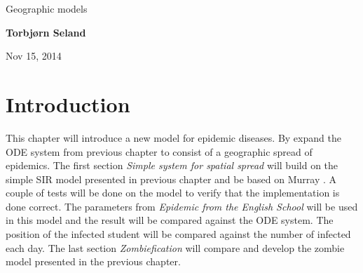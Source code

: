 \documentclass[%
twoside,                 %
final,                   %
10pt]{article}
\begin{document}




\thispagestyle{empty}

\begin{center}
{\LARGE\bf
\begin{spacing}{1.25}
Geographic models 
\end{spacing}
}
\end{center}


\begin{center}
{\bf Torbjørn Seland${}^{}$} \\ [0mm]
\end{center}

    \begin{center}
\end{center}


\begin{center}
Nov 15, 2014
\end{center}

\vspace{1cm}


\tableofcontents


\vspace{1cm} %




\section{Introduction}
This chapter will introduce a new model for epidemic diseases. By expand the ODE system from previous chapter to consist of a geographic spread of epidemics. The first section \emph{Simple system for spatial spread} will build on the simple SIR model presented in previous chapter and be based on Murray \cite{murray2003mathematical}. A couple of tests will be done on the model to verify that the implementation is done correct. The parameters from \emph{Epidemic from the English School} will be used in this model and the result will be compared against the ODE system. The position of the infected student will be compared against the number of infected each day. The last section \emph{Zombiefication} will compare and develop the zombie model presented in the previous chapter.
\end{document}
